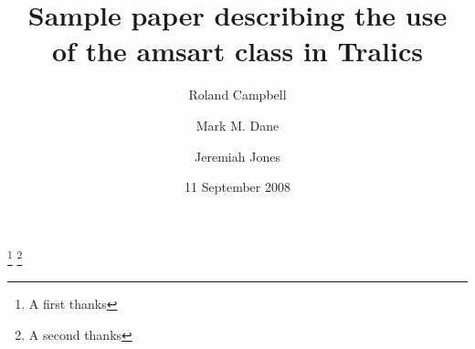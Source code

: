 \documentclass{amsart}
\numberwithin{equation}{section}
\theoremstyle{plain}
\theoremstyle{remark}
\begin{document}
\def\llg{\boldsymbol{\ell}}
\def\ext{\mathbf{\mathsf{\Lambda}}}
\def\sym{\mathbf{\mathsf{S}}}


\def\moins{\mathrel{\boldsymbol{-}}}

 \newcommand{\Pic}{\operatorname{Pic}}
 \newcommand{\Sp}{\operatorname{Sp}}
 \newcommand{\SO}{\operatorname{SO}}
 \newcommand{\SL}{\operatorname{SL}}
 \newcommand{\reg}{\operatorname{reg}}
 \newcommand{\mult}{\operatorname{mult}}
 \newcommand{\la}{\longrightarrow}

 \def\tl{T_\ell ^{\reg}}
 \def\ms#1{\mathcal{M}_{\SO_{#1}}}
 \def\ls#1{\mathcal{L}_{\SO_{#1}}}
 \def\mso{\mathcal{M}_{\SO_r}}
 \def\msl{\mathcal{M}_{\SL_r}}
 \def\lso{\mathcal{L}_{\SO_r}}
 \def\lsl{\mathcal{L}_{\SL_r}}
 \def\msp#1{\mathcal{M}_{\Sp_{2#1}}}
 \def\lsp#1{\mathcal{L}_{\Sp_{2#1}}}

 \def\ot{\scriptscriptstyle\otimes}
 \def\bu{\scriptscriptstyle\bullet}


  \author{Roland Campbell}
  \address{Department of Mathematics\\
    Pennsylvania State University\\
    Pittsburgh, Pennsylvania 13593}

  \author[Dane]{Mark M. Dane}

  \author{Jeremiah Jones}
  \address[J.~Jones]{Department of Philosophy\\
  Freedman College\\
  Periwinkle, Colorado 84320}

\title[Ams-art example]
{Sample paper describing the use\\
 of the amsart class in Tralics}

\thanks{A first thanks}
\thanks{A second thanks}
\date{11 September 2008}


\end{document}
